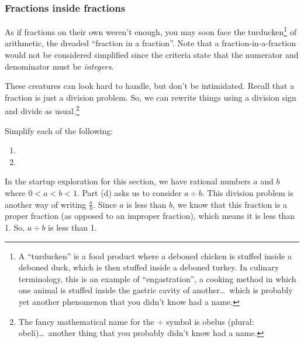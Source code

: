 \subsubsection{Fractions inside fractions}

As if fractions on their own weren't enough, you may soon face the \gls{turducken}\footnote{A ``turducken'' is a food product where a deboned chicken is stuffed inside a deboned duck, which is then stuffed inside a deboned turkey. In culinary terminology, this is an example of ``engastration'', a cooking method in which one animal is stuffed inside the gastric cavity of another\ldots\ which is probably yet another phenomenon that you didn't know had a name.} of arithmetic, the dreaded ``fraction in a fraction''. Note that a fraction-in-a-fraction would not be considered simplified since the criteria state that the numerator and denominator must be \textit{integers}.

These creatures can look hard to handle, but don't be intimidated. Recall that a fraction is just a division problem. So, we can rewrite things using a division sign and divide as usual.\footnote{The fancy mathematical name for the $\div$ symbol is \gls{obelus} (plural: obeli)\ldots\ another thing that you probably didn't know had a name.}

\begin{boxex}
Simplify each of the following:

\begin{enumerate}[itemsep=10pt]
\item {}

\item {}
\end{enumerate}
\end{boxex}

In the startup exploration for this section, we have rational numbers $a$ and $b$ where $0 < a < b < 1$. Part (d) asks us to consider $a \div b$. This division problem is another way of writing $\frac{a}{b}$. Since $a$ is less than $b$, we know that this fraction is a proper fraction (as opposed to an improper fraction), which means it is less than 1. So, $a \div b$ is less than 1.

